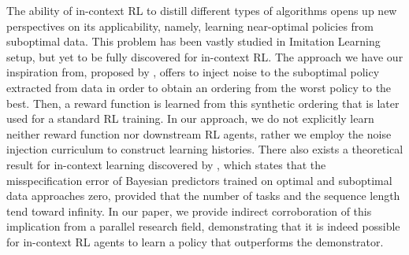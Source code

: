 \documentclass{article}
\theoremstyle{plain}
\theoremstyle{definition}
\theoremstyle{remark}
\begin{document}
The ability of in-context RL to distill different types of algorithms \cite{wang2024transformers} opens up new perspectives on its applicability, namely, learning near-optimal policies from suboptimal data. This problem has been vastly studied in Imitation Learning setup, but yet to be fully discovered for in-context RL. The approach we have our inspiration from, proposed by \citet{brown2020better}, offers to inject noise to the suboptimal policy extracted from data in order to obtain an ordering from the worst policy to the best. Then, a reward function is learned from this synthetic ordering that is later used for a standard RL training. In our approach, we do not explicitly learn neither reward function nor downstream RL agents, rather we employ the noise injection curriculum to construct learning histories. There also exists a theoretical result for in-context learning discovered by \citet{jeon2024informationtheoretic}, which states that the misspecification error of Bayesian predictors trained on optimal and suboptimal data approaches zero, provided that the number of tasks and the sequence length tend toward infinity. In our paper, we provide indirect corroboration of this implication from a parallel research field, demonstrating that it is indeed possible for in-context RL agents to learn a policy that outperforms the demonstrator.


\end{document}
